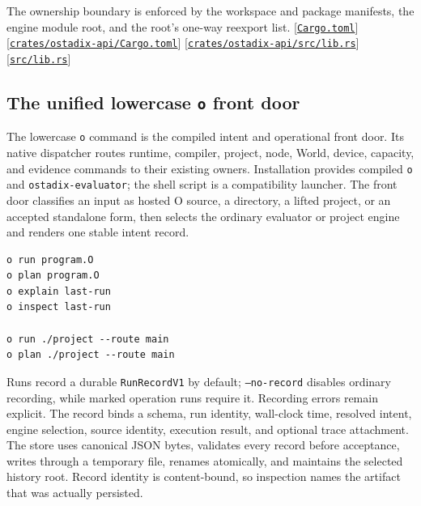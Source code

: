 \documentclass[11pt,oneside]{article}
\newcommand{\src}[1]{\textcolor{OSlate}{\scriptsize[\href{https://github.com/lostadi/OSTADIX/blob/c0b02c326b2329a95ba52447c7180bc93957cd57/#1}{\nolinkurl{#1}}]}\allowbreak}
\begin{document}
The ownership boundary is enforced by the workspace and package manifests,
the engine module root, and the root's one-way reexport list.
\src{Cargo.toml}
\src{crates/ostadix-api/Cargo.toml}
\src{crates/ostadix-api/src/lib.rs}
\src{src/lib.rs}

\subsection{The unified lowercase \texttt{o} front door}

The lowercase \texttt{o} command is the compiled intent and operational
front door. Its native dispatcher routes runtime, compiler, project, node,
World, device, capacity, and evidence commands to their existing owners.
Installation provides compiled \texttt{o} and \texttt{ostadix-evaluator};
the shell script is a compatibility launcher. The
front door classifies an input as hosted O source, a directory, a lifted
project, or an accepted standalone form, then selects the ordinary evaluator
or project engine and renders one stable intent record.

\begin{lstlisting}[style=plaincode]
o run program.O
o plan program.O
o explain last-run
o inspect last-run

o run ./project --route main
o plan ./project --route main
\end{lstlisting}

Runs record a durable \texttt{RunRecordV1} by default; \texttt{--no-record}
disables ordinary recording, while marked operation runs require it. Recording
errors remain explicit. The record binds a
schema, run identity, wall-clock time, resolved intent, engine selection,
source identity, execution result, and optional trace attachment. The store
uses canonical JSON bytes, validates every record before acceptance, writes
through a temporary file, renames atomically, and maintains the selected
history root. Record identity is content-bound, so inspection names the
artifact that was actually persisted.
\end{document}
